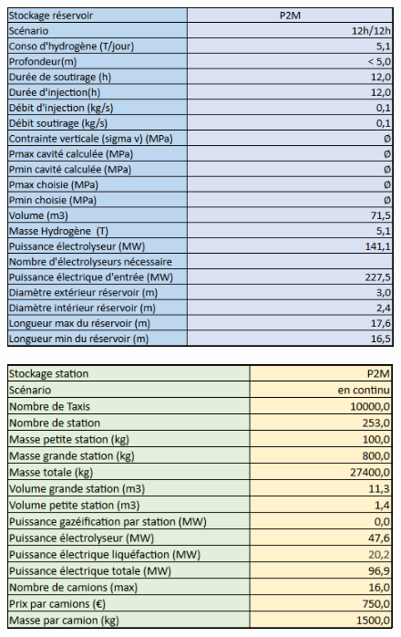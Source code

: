 \documentclass[11pt,french,a4paper]{article}
\begin{document}
\begin{figure}
\centering
\begin{minipage}{.5\textwidth}
  \centering
  \includegraphics[width=0.7\linewidth]{image/annexe/config_cavite_minee/c5.png}
  \label{fig:test1}
\end{minipage}%
\begin{minipage}{.5\textwidth}
  \centering
  \includegraphics[width=0.8\linewidth]{image/annexe/config_cavite_minee/c6.png}
  \label{fig:test2}
\end{minipage}
\end{figure}
\end{document}
